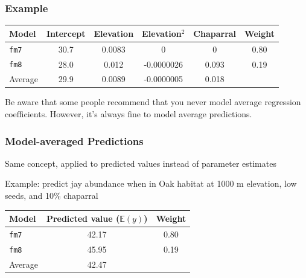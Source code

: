 \documentclass[color=usenames,dvipsnames]{beamer}\usepackage[]{graphicx}\usepackage[]{color}
\begin{document}
\begin{frame}
  \frametitle{Example}
  \begin{center}
    \begin{tabular}{lccccc}
      \hline
      Model & Intercept & Elevation & Elevation$^2$ & Chaparral & Weight \\
      \hline
      {\tt fm7} & 30.7 & 0.0083 & \alert{0}    & \alert{0}      & 0.80 \\
      {\tt fm8} & 28.0 & 0.012  & -0.0000026   & 0.093 & 0.19 \\
      \hline
      Average   & 29.9 & 0.0089 &  -0.0000005  & 0.018     &   \\
      \hline
    \end{tabular}
  \end{center}
  \pause
  \vfill
  Be aware that some people recommend that you never model average
  regression coefficients. However, it's always fine to model average
  predictions.
\end{frame}



\begin{frame}
  \frametitle{Model-averaged Predictions}
  {Same concept, applied to predicted values instead of parameter
    estimates \par}
  \pause
  \vspace{0.3cm}
  {Example: predict jay abundance when in Oak habitat at 1000 m
    elevation, low seeds, and 10\% chaparral \par}
  \pause
  \begin{center}
    \begin{tabular}{lcc}
      \hline
      Model     & Predicted value ($\mathbb{E}(y)$) & Weight \\
      \hline
      {\tt fm7} & 42.17 & 0.80 \\
      {\tt fm8} & 45.95 & 0.19 \\
      \hline
      Average   & 42.47 & \\
      \hline
    \end{tabular}
  \end{center}
\end{frame}
\end{document}
